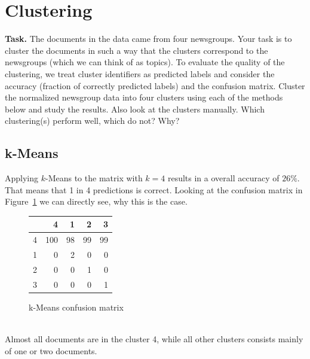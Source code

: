 \documentclass{support/acm_proc_article-sp}
\begin{document}

    \section{Clustering}

    \textbf{Task.} The documents in the data came from four newsgroups.
    Your task is to cluster the documents in such a way that the clusters correspond to the newsgroups
    (which we can think of as topics).
    To evaluate the quality of the clustering, we treat cluster identifiers as predicted labels and consider the
    accuracy (fraction of correctly predicted labels) and the confusion matrix.
    Cluster the normalized newsgroup data into four clusters using each of the methods below and study the results.
    Also look at the clusters manually.
    Which clustering(s) perform well, which do not?
    Why?


    \subsection{k-Means}
    \label{subsec:k-means}

    Applying $k$-Means to the matrix with $k = 4$ results in a overall accuracy of $26\%$.
    That means that 1 in 4 predictions is correct.
    Looking at the confusion matrix in Figure~\ref{tab:k-means} we can directly see, why this is the case.
    \begin{figure}[htbp]
        \begin{center}
        \begin{tabular}{r | r r r r}
            & 4 & 1 & 2 & 3 \\
            \hline
            4 & 100 & 98 & 99 & 99 \\
            1 & 0 & 2 & 0 & 0 \\
            2 & 0 & 0 & 1 & 0 \\
            3 & 0 & 0 & 0 & 1
        \end{tabular}
        \end{center}
        \caption{k-Means confusion matrix}
        \label{tab:k-means}
    \end{figure} \\
    Almost all documents are in the cluster 4, while all other clusters consists mainly of one or two documents.
\end{document}
